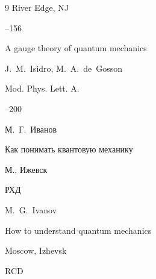 \begin{thebibliography}{9}
\publaddr River Edge, NJ


--156







\paper A gauge theory of quantum mechanics

\by   J.~M.~Isidro, M.~A.~de~Gosson

\jour Mod. Phys. Lett. A.




--200




\by М.~Г.~Иванов

\book Как понимать квантовую механику

\publaddr М., Ижевск

\publ РХД



\misctransl

\by M.~G.~Ivanov

\book How to understand quantum mechanics

\publaddr Moscow, Izhevsk

\publ RCD







\end{thebibliography}



\noindent

\hskip6.5cm \thedate \par\noindent

\hskip6.5cm\therevdate



%


%




\makeengtitle







\newpage



%



%